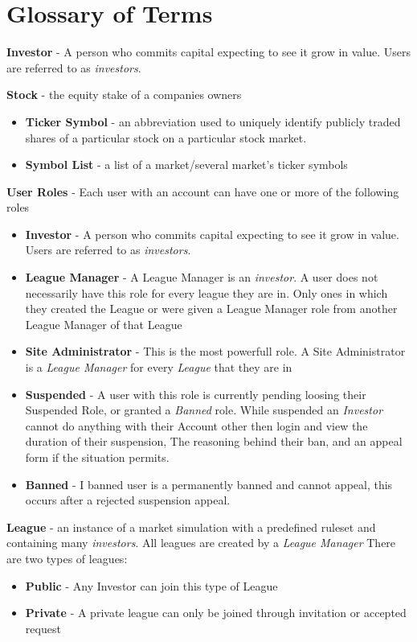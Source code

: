 \section{Glossary of Terms}

{
\raggedright
\textbf{Investor} - A person who commits capital expecting to see it grow in value. Users are referred 
to as \emph{investors}.

\textbf{Stock} - the equity stake of a companies owners
\begin{itemize}
\item \textbf{Ticker Symbol} - an abbreviation used to uniquely identify publicly traded shares of a particular stock on a particular stock market.
\item \textbf{Symbol List} - a list of a market/several market's ticker symbols
\end{itemize}

\textbf{User Roles} - Each user with an account can have one or more of the following roles
\begin{itemize}
\item \textbf{Investor} - A person who commits capital expecting to see it grow in value. Users are referred 
to as \emph{investors}.
\item \textbf{League Manager} - A League Manager is an \emph{investor}.  A user does not necessarily have this role for every league they are in.  Only ones in which they created the League or were given a League Manager role from another League Manager of that League 
\item \textbf{Site Administrator} - This is the most powerfull role. A Site Administrator is a \emph{League Manager} for every \emph{League} that they are in
\item \textbf{Suspended} - A user with this role is currently pending loosing their Suspended Role, or granted a \emph{Banned} role.  While suspended an \emph{Investor} cannot do anything with their Account other then login and view the duration of their suspension, The reasoning behind their ban, and an appeal form if the situation permits.
\item \textbf{Banned} - I banned user is a permanently banned and cannot appeal, this occurs after a rejected suspension appeal.
\end{itemize}

\textbf{League} - an instance of a market simulation with a predefined ruleset and containing many \emph{investors}. All leagues are created by a \emph{League Manager} There are two types of leagues:
\begin{itemize}
\item \textbf{Public} - Any Investor can join this type of League
\item \textbf{Private} - A private league can only be joined through invitation or accepted request
\end{itemize}


}
